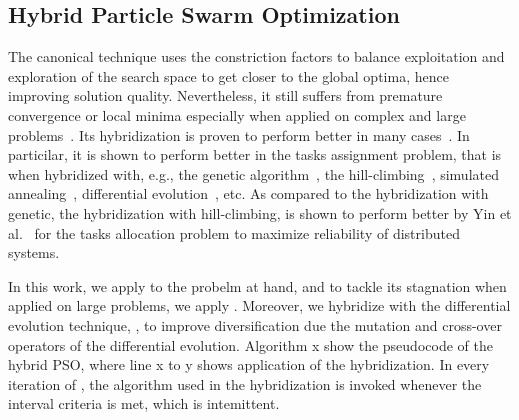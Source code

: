 \subsection{Hybrid Particle Swarm Optimization}
The canonical \pso{} technique uses the constriction factors to balance exploitation and exploration of the search space to get closer to the global optima, hence improving solution quality. Nevertheless, it still suffers from premature convergence or local minima especially when applied on complex and large problems~\cite{Rini2011ParticleChallenges}. Its hybridization is proven to perform better in many cases~\cite{Sengupta2018ParticlePerspectivesb}. In particilar, it is shown to perform better in the tasks assignment problem, that is when hybridized with, e.g., the genetic algorithm~\cite{Optimizing the Task Allocation Step for Multi-Core Processors within AUTOSAR}, the hill-climbing~\cite{yin2007task}, simulated annealing~\cite{A hybrid algorithm based on particle swarm optimization and simulated annealing to holon task allocation for holonic manufacturing system}, differential evolution~\cite{A particle swarm optimization and differential evolution algorithms for job shop scheduling problem}, etc. As compared to the hybridization with genetic, the hybridization with hill-climbing, \hcpso{} is shown to perform better by Yin et al.~\cite{yin2007task} for the tasks allocation problem to maximize reliability of distributed systems. 

In this work, we apply \hcpso to the probelm at hand, and to tackle its stagnation when applied on large problems, we apply \hcpso{}. Moreover, we hybridize \pso with the differential evolution technique, \depso{}, to improve diversification due the mutation and cross-over operators of the differential evolution. Algorithm x show the pseudocode of the hybrid PSO, where line x to y shows application of the hybridization. In every iteration of \pso{}, the algorithm used in the hybridization is invoked whenever the interval criteria is met, which is intemittent.


